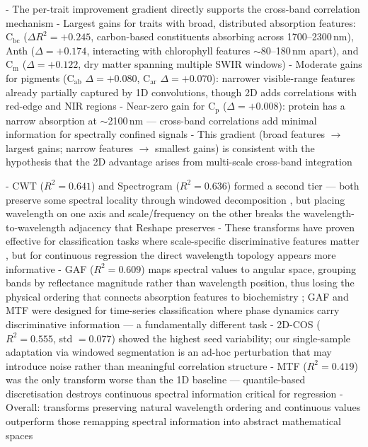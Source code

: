  - The per-trait improvement gradient directly supports
   the cross-band correlation mechanism
 - Largest gains for traits with broad, distributed
   absorption features:
   C$_\text{bc}$ ($\Delta R^2 = +0.245$, carbon-based
   constituents absorbing across 1700--2300\,nm),
   Anth ($\Delta = +0.174$, interacting with chlorophyll
   features $\sim$80--180\,nm apart),
   and C$_\text{m}$ ($\Delta = +0.122$, dry matter
   spanning multiple SWIR windows)
   \citep{curran1989imaging, feret2021prospectpro}
 - Moderate gains for pigments (C$_\text{ab}$
   $\Delta = +0.080$, C$_\text{ar}$ $\Delta = +0.070$):
   narrower visible-range features already partially
   captured by 1D convolutions, though 2D adds
   correlations with red-edge and NIR regions
   \citep{homolova2013review}
 - Near-zero gain for C$_\text{p}$ ($\Delta = +0.008$):
   protein has a narrow absorption at $\sim$2100\,nm
   \citep{feret2021prospectpro} --- cross-band
   correlations add minimal information for spectrally
   confined signals
 - This gradient (broad features $\rightarrow$ largest
   gains; narrow features $\rightarrow$ smallest gains)
   is consistent with the hypothesis that the 2D
   advantage arises from multi-scale cross-band
   integration

 - CWT ($R^2 = 0.641$) and Spectrogram ($R^2 = 0.636$)
   formed a second tier --- both preserve some spectral
   locality through windowed decomposition
   \citep{addison2017wavelet, shuai2025multichannel},
   but placing wavelength on one axis and scale/frequency
   on the other breaks the wavelength-to-wavelength
   adjacency that Reshape preserves
 - These transforms have proven effective for
   classification tasks where scale-specific
   discriminative features matter
   \citep{ong2025sugarcane, zhuang2023cwt,
   shuai2025multichannel, zhang2025gaf}, but for
   continuous regression the direct wavelength topology
   appears more informative
 - GAF ($R^2 = 0.609$) maps spectral values to angular
   space, grouping bands by reflectance magnitude rather
   than wavelength position, thus losing the physical
   ordering that connects absorption features to
   biochemistry \citep{wang2015gaf, ganesan2021gaf};
   GAF and MTF were designed for time-series
   classification where phase dynamics carry
   discriminative information --- a fundamentally
   different task
 - 2D-COS ($R^2 = 0.555$, std $= 0.077$) showed the
   highest seed variability; our single-sample adaptation
   via windowed segmentation \citep{noda2004twodimensional}
   is an ad-hoc perturbation that may introduce noise
   rather than meaningful correlation structure
 - MTF ($R^2 = 0.419$) was the only transform worse than
   the 1D baseline --- quantile-based discretisation
   destroys continuous spectral information critical for
   regression \citep{wang2015gaf}
 - Overall: transforms preserving natural wavelength
   ordering and continuous values outperform those
   remapping spectral information into abstract
   mathematical spaces


